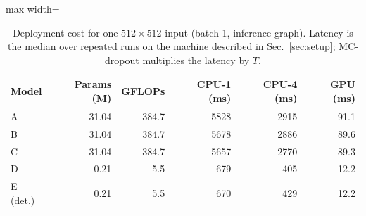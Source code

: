 \begin{table}[t]
\centering
\caption{Deployment cost for one $512{\times}512$ input (batch 1, inference graph). Latency is the median over repeated runs on the machine described in Sec.~\ref{sec:setup}; MC-dropout multiplies the latency by $T$.}
\label{tab:eff}
\small
\begin{adjustbox}{max width=\columnwidth}\begin{tabular}{l rrrrr}
\toprule
Model & Params (M) & GFLOPs & CPU-1 (ms) & CPU-4 (ms) & GPU (ms) \\
\midrule
A & 31.04 & 384.7 & 5828 & 2915 & 91.1 \\
B & 31.04 & 384.7 & 5678 & 2886 & 89.6 \\
C & 31.04 & 384.7 & 5657 & 2770 & 89.3 \\
D & 0.21 & 5.5 & 679 & 405 & 12.2 \\
E (det.) & 0.21 & 5.5 & 670 & 429 & 12.2 \\
\bottomrule
\end{tabular}\end{adjustbox}
\end{table}